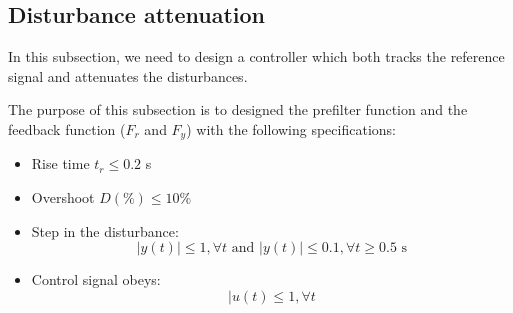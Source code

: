 \subsection{Disturbance attenuation}

In this subsection, we need to design a controller which both tracks the reference signal and attenuates the disturbances. 

The purpose of this subsection is to designed the prefilter function and the feedback function ($F_r$ and $F_y$) with the following specifications:

\begin{itemize}
    \item Rise time $t_r \leq 0.2$ s
    \item Overshoot $D(\%) \leq 10\%$
    \item Step in the disturbance:
        $$|y(t)| \leq 1, \forall t \text{ and } |y(t)| \leq 0.1, \forall t \geq 0.5\text{ s}$$ 
    \item Control signal obeys:
        $$|u(t) \leq 1, \forall t$$
\end{itemize}


% 
% 
% 

